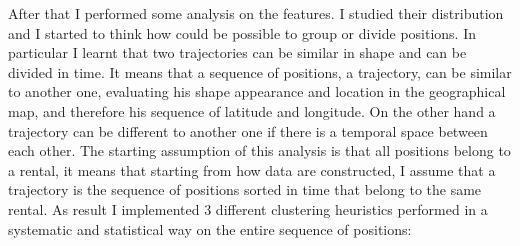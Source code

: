 After that I performed some analysis on the features. I studied their distribution and I started to think how could be possible to group or divide positions. In particular I learnt that two trajectories can be similar in shape and can be divided in time. It means that a sequence of positions, a trajectory, can be similar to another one, evaluating his shape appearance and location in the geographical map, and therefore his sequence of latitude and longitude. On the other hand a trajectory can be different to another one if there is a temporal space between each other. The starting assumption of this analysis is that all positions belong to a rental, it means that starting from how data are constructed, I assume that a trajectory is the sequence of positions sorted in time that belong to the same rental. As result I implemented 3 different clustering heuristics performed in a systematic and statistical way on the entire sequence of positions:
